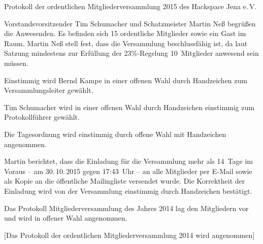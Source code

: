 \documentclass[ngerman]{scrartcl}
\begin{document}
\begin{Protokoll}{Protokoll der ordentlichen Mitgliederversammlung 2015 des Hackspace Jena e.\,V.}


\protokollKopf{}


Vorstandsvorsitzender Tim Schumacher und Schatzmeister Martin Neß
begrüßen die Anwesenden. Es befinden sich 15 ordentliche Mitglieder
sowie ein Gast im Raum. Martin Neß stell fest, dass die Versammlung
beschlussfähig ist, da laut Satzung mindestens zur Erfüllung der
23\%-Regelung 10~Mitglieder anwesend sein müssen.



  Einstimmig wird Bernd Kampe in einer offenen Wahl durch
  Handzeichen zum Versammlungsleiter gewählt.

  Tim Schumacher wird in einer offenen Wahl durch Handzeichen
  einstimmig zum Protokollführer gewählt.


Die Tagesordnung wird einstimmig durch offene Wahl mit Handzeichen
angenommen.


Martin berichtet, dass die Einladung für die Versammlung mehr als
14~Tage im Voraus -- am 30.\,10.\,2015 gegen 17:43~Uhr -- an alle
Mitglieder per E-Mail sowie als Kopie an die öffentliche Mailingliste
versendet wurde. Die Korrektheit der Einladung wird von der
Versammlung einstimmig durch Handzeichen bestätigt.


Das Protokoll Mitgliederversammlung des Jahres 2014 lag den
Mitgliedern vor und wird in offener Wahl angenommen.

\begin{Abstimmung}
  [Das Protokoll der ordentlichen Mitgliederversammlung 2014 wird angenommen]
\end{Abstimmung}



\end{Protokoll}
\end{document}
